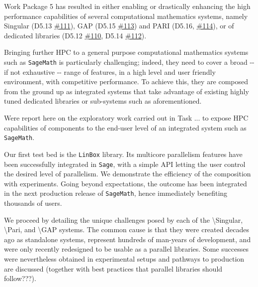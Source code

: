 Work Package 5 has resulted in either enabling or drastically enhancing
the high performance capabilities of several computational mathematics
systems, namely Singular (D5.13
\href{https://github.com/OpenDreamKit/OpenDreamKit/issues/111}{\#111}),
GAP (D5.15
\href{https://github.com/OpenDreamKit/OpenDreamKit/issues/113}{\#113})
and PARI (D5.16,
\href{https://github.com/OpenDreamKit/OpenDreamKit/issues/114}{\#114}),
or of dedicated libraries (D5.12
\href{https://github.com/OpenDreamKit/OpenDreamKit/issues/110}{\#110},
D5.14
\href{https://github.com/OpenDreamKit/OpenDreamKit/issues/112}{\#112}).

Bringing further HPC to a general purpose computational mathematics
systems such as \texttt{SageMath} is particularly challenging; indeed,
they need to cover a broad -\/- if not exhaustive -\/- range of
features, in a high level and user friendly environment, with
competitive performance. To achieve this, they are composed from the
ground up as integrated systems that take advantage of existing highly
tuned dedicated libraries or sub-systems such as aforementioned.

Were report here on the exploratory work carried out in Task ... to
expose HPC capabilities of components to the end-user level of an
integrated system such as \texttt{SageMath}.

Our first test bed is the \texttt{LinBox} library. Its multicore
parallelism features have been successfully integrated in \texttt{Sage},
with a simple API letting the user control the desired level of
parallelism. We demonstrate the efficiency of the composition with
experiments. Going beyond expectations, the outcome has been integrated
in the next production release of \texttt{SageMath}, hence immediately
benefiting thousands of users.

We proceed by detailing the unique challenges posed by each of the
\textbackslash Singular, \textbackslash Pari, and \textbackslash GAP
systems. The common cause is that they were created decades ago as
standalone systems, represent hundreds of man-years of development, and
were only recently redesigned to be usable as a parallel libraries. Some
successes were nevertheless obtained in experimental setups and pathways
to production are discussed (together with best practices that parallel
libraries should follow???).
